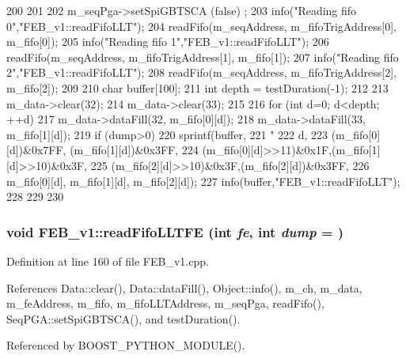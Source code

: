 \begin{DoxyCode}
200                                   {
201 
202   m_seqPga->setSpiGBTSCA (false) ;
203   info("Reading fifo 0","FEB_v1::readFifoLLT");
204   readFifo(m_seqAddress, m_fifoTrigAddress[0], m_fifo[0]);
205   info("Reading fifo 1","FEB_v1::readFifoLLT");
206   readFifo(m_seqAddress, m_fifoTrigAddress[1], m_fifo[1]);
207   info("Reading fifo 2","FEB_v1::readFifoLLT");
208   readFifo(m_seqAddress, m_fifoTrigAddress[2], m_fifo[2]);
209   
210   char buffer[100];
211   int depth = testDuration(-1);
212 
213   m_data->clear(32);
214   m_data->clear(33);
215   
216   for (int d=0; d<depth; ++d){
217     m_data->dataFill(32, m_fifo[0][d]);
218     m_data->dataFill(33, m_fifo[1][d]);
219     if (dump>0) {
220       sprintf(buffer,
221           "%
222           d,
223           (m_fifo[0][d])&0x7FF, (m_fifo[1][d])&0x3FF, 
224           (m_fifo[0][d]>>11)&0x1F,(m_fifo[1][d]>>10)&0x3F, 
225           (m_fifo[2][d]>>10)&0x3F,(m_fifo[2][d])&0x3FF,
226           m_fifo[0][d], m_fifo[1][d], m_fifo[2][d]);
227       info(buffer,"FEB_v1::readFifoLLT");
228     }
229   }
230 }
\end{DoxyCode}
\hypertarget{classFEB__v1_a27df6aecacccf3415ff98092b7da5485}{
\subsubsection[{readFifoLLTFE}]{\setlength{\rightskip}{0pt plus 5cm}void FEB\_\-v1::readFifoLLTFE (int {\em fe}, \/  int {\em dump} = {})}}
\label{classFEB__v1_a27df6aecacccf3415ff98092b7da5485}


Definition at line 160 of file FEB\_\-v1.cpp.

References Data::clear(), Data::dataFill(), Object::info(), m\_\-ch, m\_\-data, m\_\-feAddress, m\_\-fifo, m\_\-fifoLLTAddress, m\_\-seqPga, readFifo(), SeqPGA::setSpiGBTSCA(), and testDuration().

Referenced by BOOST\_\-PYTHON\_\-MODULE().


